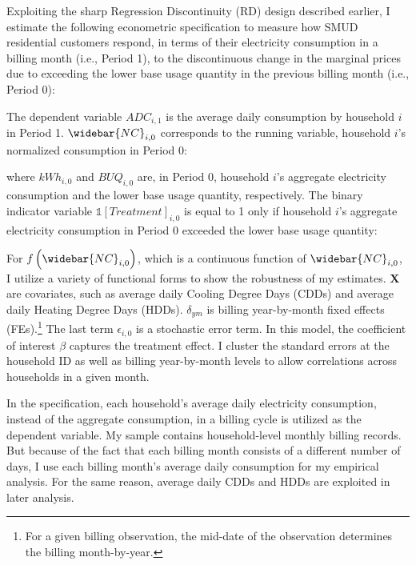 Exploiting the sharp Regression Discontinuity (RD) design described earlier, I estimate the following econometric specification to measure how SMUD residential customers respond, in terms of their electricity consumption in a billing month (i.e., Period 1), to the discontinuous change in the marginal prices due to exceeding the lower base usage quantity in the previous billing month (i.e., Period 0):

The dependent variable $ADC_{i, 1}$ is the average daily consumption by household $i$ in Period 1. $\widebar{NC}_{i, 0}$ corresponds to the running variable, household $i$'s normalized consumption in Period 0:

where $kWh_{i, 0}$ and $BUQ_{i, 0}$ are, in Period 0, household $i$'s aggregate electricity consumption and the lower base usage quantity, respectively. The binary indicator variable $\mathbb{1}[Treatment]_{i, 0}$ is equal to 1 only if household $i$'s aggregate electricity consumption in Period 0 exceeded the lower base usage quantity:

For $f\left( \widebar{NC}_{i, 0} \right)$, which is a continuous function of $\widebar{NC}_{i, 0}$, I utilize a variety of functional forms to show the robustness of my estimates. $\boldsymbol{X}$ are covariates, such as average daily Cooling Degree Days (CDDs) and average daily Heating Degree Days (HDDs). $\delta_{ym}$ is billing year-by-month fixed effects (FEs).\footnote{For a given billing observation, the mid-date of the observation determines the billing month-by-year.} The last term $\epsilon_{i, 0}$ is a stochastic error term. In this model, the coefficient of interest $\beta$ captures the treatment effect. I cluster the standard errors at the household ID as well as billing year-by-month levels to allow correlations across households in a given month.

In the specification, each household's average daily electricity consumption, instead of the aggregate consumption, in a billing cycle is utilized as the dependent variable. My sample contains household-level monthly billing records. But because of the fact that each billing month consists of a different number of days, I use each billing month's average daily consumption for my empirical analysis. For the same reason, average daily CDDs and HDDs are exploited in later analysis. 